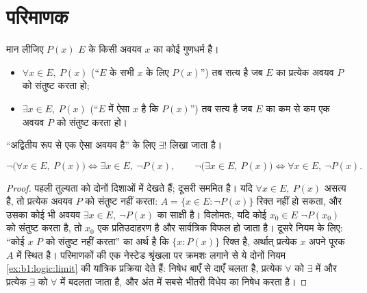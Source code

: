 \section{परिमाणक}

\begin{definition}[परिमाणक]\label{def:b1:logic:quantifiers}
मान लीजिए $P(x)$  $E$ के किसी अवयव $x$ का कोई गुणधर्म है।
\begin{itemize}
  \item $\forall x \in E,\ P(x)$ (``$E$ के सभी $x$ के लिए $P(x)$'') तब सत्य
  है जब $E$ का प्रत्येक अवयव $P$ को संतुष्ट करता हो;
  \item $\exists x \in E,\ P(x)$ (``$E$ में ऐसा $x$ है कि $P(x)$'') तब सत्य
  है जब $E$ का कम से कम एक अवयव $P$ को संतुष्ट करता हो।
\end{itemize}
``अद्वितीय रूप से एक ऐसा अवयव है'' के लिए $\exists!$ लिखा जाता है।
\end{definition}

\begin{proposition}[परिमाणकों का निषेध]\label{prop:b1:logic:negquant}
\[
\lnot\bigl(\forall x \in E,\ P(x)\bigr) \iff
\exists x \in E,\ \lnot P(x),
\qquad
\lnot\bigl(\exists x \in E,\ P(x)\bigr) \iff
\forall x \in E,\ \lnot P(x).
\]
\end{proposition}

\begin{proof}
पहली तुल्यता को दोनों दिशाओं में देखते हैं; दूसरी सममित है। यदि $\forall x
\in E,\ P(x)$ असत्य है, तो प्रत्येक अवयव $P$ को संतुष्ट नहीं करता: 
$A = \{x \in E : \lnot P(x)\}$ रिक्त नहीं हो सकता, और उसका कोई भी अवयव
$\exists x \in E,\ \lnot P(x)$ का साक्षी है। विलोमतः, यदि कोई $x_0 \in E$
$\lnot P(x_0)$ को संतुष्ट करता है, तो $x_0$ एक प्रतिउदाहरण है और सार्वत्रिक
 विफल हो जाता है। दूसरे नियम के लिए: ``कोई $x$ $P$ को संतुष्ट नहीं करता''
का अर्थ है कि  $\{x : P(x)\}$ रिक्त है, अर्थात् प्रत्येक $x$ अपने
पूरक $A$ में स्थित है। परिमाणकों की एक नेस्टेड श्रृंखला पर क्रमशः लगाने से
ये दोनों नियम \cref{ex:b1:logic:limit} की यांत्रिक प्रक्रिया देते हैं: निषेध
बाएँ से दाएँ चलता है, प्रत्येक $\forall$ को $\exists$ में और प्रत्येक
$\exists$ को $\forall$ में बदलता जाता है, और अंत में सबसे भीतरी विधेय का
निषेध करता है।
\end{proof}

